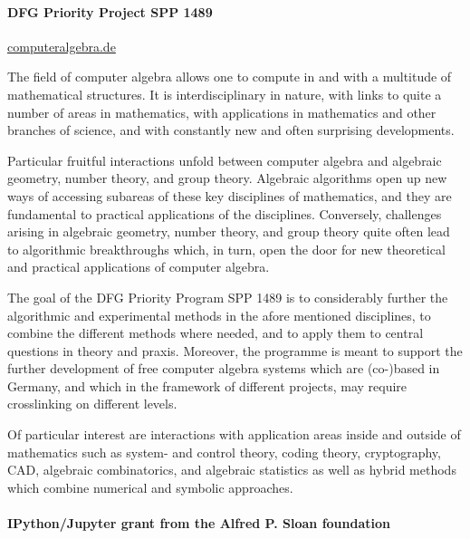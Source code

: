 \documentclass[a4paper,11pt]{article}
\begin{document}
\paragraph{DFG Priority Project SPP 1489}
\url{computeralgebra.de}


The field of computer algebra allows one to compute in and with a
multitude of mathematical structures. It is interdisciplinary in
nature, with links to quite a number of areas in mathematics, with
applications in mathematics and other branches of science, and with
constantly new and often surprising developments.

Particular fruitful interactions unfold between computer algebra and
algebraic geometry, number theory, and group theory. Algebraic
algorithms open up new ways of accessing subareas of these key
disciplines of mathematics, and they are fundamental to practical
applications of the disciplines. Conversely, challenges arising in
algebraic geometry, number theory, and group theory quite often lead
to algorithmic breakthroughs which, in turn, open the door for new
theoretical and practical applications of computer algebra.

The goal of the DFG Priority Program SPP 1489 is to considerably
further the algorithmic and experimental methods in the afore
mentioned disciplines, to combine the different methods where needed,
and to apply them to central questions in theory and praxis. Moreover,
the programme is meant to support the further development of free
computer algebra systems which are (co-)based in Germany, and which in
the framework of different projects, may require crosslinking on
different levels.

Of particular interest are interactions with application areas inside
and outside of mathematics such as system- and control theory, coding
theory, cryptography, CAD, algebraic combinatorics, and algebraic
statistics as well as hybrid methods which combine numerical and
symbolic approaches.


\paragraph{IPython/Jupyter grant from the Alfred P. Sloan foundation}
\end{document}
